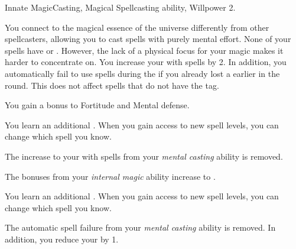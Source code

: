     \begin{feat}{Innate Magic}{Casting, Magical}
        \featpre Spellcasting ability, Willpower 2.

         You connect to the magical essence of the universe differently from other spellcasters, allowing you to cast spells with purely mental effort.
        None of your spells have  or .
        However, the lack of a physical focus for your magic makes it harder to concentrate on.
        You increase your  with spells by 2.
        In addition, you automatically fail to use  spells during the  if you already lost a  earlier in the round.
        This does not affect spells that do not have the  tag.

         You gain a  bonus to Fortitude and Mental defense.

         You learn an additional .
        When you gain access to new spell levels, you can change which spell you know.

         The increase to your  with spells from your \textit{mental casting} ability is removed.

         The bonuses from your \textit{internal magic} ability increase to .

         You learn an additional .
        When you gain access to new spell levels, you can change which spell you know.

         The automatic spell failure from your \textit{mental casting} ability is removed.
        In addition, you reduce your  by 1.
    \end{feat}

